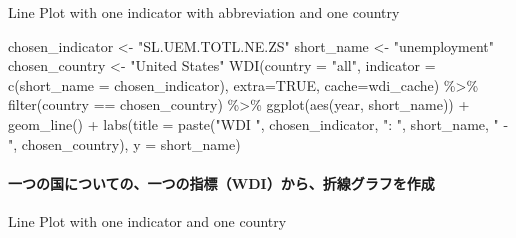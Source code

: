 \documentclass[
]{bxjsbook}
\newenvironment{Shaded}{\begin{snugshade}}{\end{snugshade}}
\newcommand{\AttributeTok}[1]{\textcolor[rgb]{0.77,0.63,0.00}{#1}}
\newcommand{\ConstantTok}[1]{\textcolor[rgb]{0.00,0.00,0.00}{#1}}
\newcommand{\FunctionTok}[1]{\textcolor[rgb]{0.00,0.00,0.00}{#1}}
\newcommand{\NormalTok}[1]{#1}
\newcommand{\OtherTok}[1]{\textcolor[rgb]{0.56,0.35,0.01}{#1}}
\newcommand{\SpecialCharTok}[1]{\textcolor[rgb]{0.00,0.00,0.00}{#1}}
\newcommand{\StringTok}[1]{\textcolor[rgb]{0.31,0.60,0.02}{#1}}
\theoremstyle{definition}
\theoremstyle{definition}
\theoremstyle{definition}
\theoremstyle{definition}
\theoremstyle{remark}
\begin{document}
Line Plot with one indicator with abbreviation and one country

\begin{Shaded}
\begin{Highlighting}[]
\NormalTok{chosen\_indicator }\OtherTok{\textless{}{-}} \StringTok{"SL.UEM.TOTL.NE.ZS"}
\NormalTok{short\_name }\OtherTok{\textless{}{-}} \StringTok{"unemployment"}
\NormalTok{chosen\_country }\OtherTok{\textless{}{-}} \StringTok{"United States"}
\FunctionTok{WDI}\NormalTok{(}\AttributeTok{country =} \StringTok{"all"}\NormalTok{, }\AttributeTok{indicator =} \FunctionTok{c}\NormalTok{(}\AttributeTok{short\_name =}\NormalTok{ chosen\_indicator), }\AttributeTok{extra=}\ConstantTok{TRUE}\NormalTok{, }\AttributeTok{cache=}\NormalTok{wdi\_cache) }\SpecialCharTok{\%\textgreater{}\%}
  \FunctionTok{filter}\NormalTok{(country }\SpecialCharTok{==}\NormalTok{ chosen\_country) }\SpecialCharTok{\%\textgreater{}\%} 
  \FunctionTok{ggplot}\NormalTok{(}\FunctionTok{aes}\NormalTok{(year, short\_name)) }\SpecialCharTok{+} \FunctionTok{geom\_line}\NormalTok{() }\SpecialCharTok{+}
  \FunctionTok{labs}\NormalTok{(}\AttributeTok{title =} \FunctionTok{paste}\NormalTok{(}\StringTok{"WDI "}\NormalTok{, chosen\_indicator, }\StringTok{": "}\NormalTok{, short\_name, }\StringTok{" {-} "}\NormalTok{, chosen\_country),}
       \AttributeTok{y =}\NormalTok{ short\_name)}
\end{Highlighting}
\end{Shaded}

\hypertarget{ux4e00ux3064ux306eux56fdux306bux3064ux3044ux3066ux306eux4e00ux3064ux306eux6307ux6a19wdiux304bux3089ux6298ux7ddaux30b0ux30e9ux30d5ux3092ux4f5cux6210}{%
\paragraph{一つの国についての、一つの指標（WDI）から、折線グラフを作成}\label{ux4e00ux3064ux306eux56fdux306bux3064ux3044ux3066ux306eux4e00ux3064ux306eux6307ux6a19wdiux304bux3089ux6298ux7ddaux30b0ux30e9ux30d5ux3092ux4f5cux6210}}

Line Plot with one indicator and one country
\end{document}
